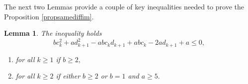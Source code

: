 \documentclass[12pt,reqno]{amsart}
\theoremstyle{plain}
\newtheorem{lem}{Lemma}
\theoremstyle{definition}
\theoremstyle{remark}
\begin{document}


The next two Lemmas provide a couple of key inequalities needed to prove the Proposition \ref{propsamediffim}. 

\begin{lem}\label{lem11}
    The inequality holds
    \begin{equation}\label{eq00}
        bc_k^2+ad_{k+1}^2-abc_kd_{k+1}+abc_{k}-2ad_{k+1}+a\le 0,
    \end{equation}
    \begin{enumerate}
        \item for all $k\geq 1$ if $b\geq 2,$
        \item for all $k\geq 2$ if either $b\geq 2$ or $b=1$ and $a\geq 5.$
    \end{enumerate}
\end{lem}
\end{document}
